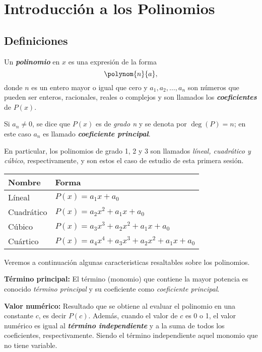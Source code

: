 \newpage
\section{Introducción a los Polinomios}

\subsection{Definiciones}

\begin{section-definition.tcb}
    Un \textbf{\emph{polinomio}} en $x$ es una expresión de la forma
    \[
        \polynom{n}{a},
    \]
    donde $n$ es un entero mayor o igual que cero y $a_1, a_2, \dots, a_n$ son números que pueden ser enteros,
    racionales, reales o complejos y son llamados los \textbf{\emph{coeficientes}} de $P(x)$.
\end{section-definition.tcb}

Si $a_n \neq 0$, se dice que $P(x)$ es de \emph{grado n} y se denota por $\deg{(P)} = n$; en este caso $a_n$ es llamado \textbf{\emph{coeficiente principal}}.

En particular, los polinomios de grado 1, 2 y 3 son llamados \emph{líneal, cuadrático y cúbico},
respectivamente, y son estos el caso de estudio de esta primera sesión.

\begin{table}[H]
    \centering
    \begin{tabular}{p{2.5cm} p{6.5cm}}
        \hline
        Nombre & Forma \\
        \hline \hline
        Líneal & $P(x) = a_1 x + a_0$\\
        Cuadrático & $P(x) = a_2 x^2 + a_1 x + a_0$\\
        Cúbico & $P(x) = a_3 x^3 + a_2 x^2 + a_1 x + a_0$\\
        Cuártico & $P(x) = a_4 x^4 + a_3 x^3 + a_2 x^2 + a_1 x + a_0$\\
        \hline
    \end{tabular}
\end{table}

Veremos a continuación algunas caracteristicas resaltables sobre los polinomios.

\textbf{Término principal:} El término (monomio) que contiene la mayor potencia es conocido \emph{término principal} y su coeficiente como \emph{coeficiente principal}.

\textbf{Valor numérico:} Resultado que se obtiene al evaluar el polinomio en una constante $c$, es decir $P(c)$.
Además, cuando el valor de $c$ es 0 o 1, el valor numérico
es igual al \textbf{\textit{término independiente}} y a la suma de todos los coeficientes, respectivamente.
Siendo el término independiente aquel monomio que no tiene variable.

